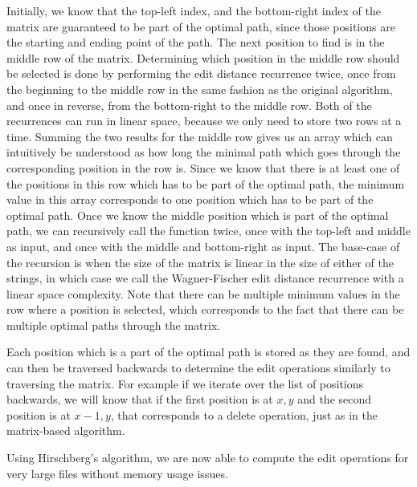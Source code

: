 Initially, we know that the top-left index, and the bottom-right index of the matrix are
guaranteed to be part of the optimal path, since those positions are the starting and
ending point of the path. The next position to find is in the middle row of the matrix.
Determining which position in the middle row should be selected is done by performing the
edit distance recurrence twice, once from the beginning to the middle row in the same
fashion as the original algorithm, and once in reverse, from the bottom-right to the
middle row. Both of the recurrences can run in linear space, because we only need to store
two rows at a time. Summing the two results for the middle row gives us an array which can
intuitively be understood as how long the minimal path which goes through the
corresponding position in the row is. Since we know that there is at least one of the
positions in this row which has to be part of the optimal path, the minimum value in this
array corresponds to one position which has to be part of the optimal path. Once we know
the middle position which is part of the optimal path, we can recursively call the
function twice, once with the top-left and middle as input, and once with the middle and
bottom-right as input. The base-case of the recursion is when the size of the matrix is
linear in the size of either of the strings, in which case we call the Wagner-Fischer edit
distance recurrence with a linear space complexity. Note that there can be multiple
minimum values in the row where a position is selected, which corresponds to the fact that
there can be multiple optimal paths through the matrix.

Each position which is a part of the optimal path is stored as they are found, and can
then be traversed backwards to determine the edit operations similarly to traversing the
matrix. For example if we iterate over the list of positions backwards, we will know that
if the first position is at $x, y$ and the second position is at $x - 1, y$, that
corresponds to a delete operation, just as in the matrix-based algorithm.

Using Hirschberg's algorithm, we are now able to compute the edit operations for very
large files without memory usage issues.

